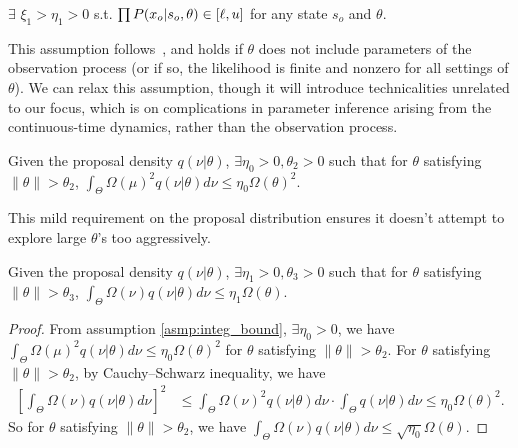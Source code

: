 \begin{assumption}
$\exists$ $ \xi_1 > \eta_1 > 0$ s.t.
$\prod P(x_o | s_o, \theta) \in [\ell, u]$ for any state $s_o$ and $\theta$.%
  \label{asmp:obs_bnd}
\end{assumption}
\noindent This assumption follows~\cite{miasojedow2017}, and holds if
$\theta$ does not include parameters of the observation process (or if so,
the likelihood is finite and nonzero for all settings of $\theta$). We can relax this assumption,
though it will introduce technicalities unrelated to our focus, which 
is on complications in parameter inference arising from the continuous-time
dynamics, rather than the observation process. 

\begin{assumption}
Given the proposal density $q(\nu | \theta)$, $\exists \eta_0 > 0, \theta_2 > 0$ 
such that for $\theta$ satisfying $\| \theta \|  > \theta_2$, 
$ \int_\Theta \Omega(\mu)^2 q(\nu | \theta)d\nu \leq \eta_0 \Omega(\theta)^2.$
\label{asmp:integ_bound}
\end{assumption}
\noindent This mild requirement on the proposal distribution ensures it 
doesn't attempt
to explore large $\theta$'s too aggressively.
\begin{corollary}
Given the proposal density $q(\nu | \theta)$, $\exists \eta_1 > 0, \theta_3 > 0$ such that for $\theta$ 
satisfying $\| \theta \|  > \theta_3$, 
$ \int_\Theta \Omega(\nu) q(\nu | \theta)d\nu \leq \eta_1 \Omega(\theta).$
\label{corol:integ_bound}
\end{corollary}
\begin{proof}
From assumption \ref{asmp:integ_bound},  $\exists \eta_0 > 0$, we have $ \int_\Theta \Omega(\mu)^2 q(\nu | \theta)d\nu \leq \eta_0 \Omega(\theta)^2$ for $\theta$ satisfying $\| \theta \|  > \theta_2$.
For $\theta$ satisfying $\| \theta \|  > \theta_2$, by Cauchy–Schwarz inequality, we have
\begin{align*}
\left[ \int_\Theta \Omega(\nu) q(\nu | \theta) d\nu \right]^2 &\le \int_\Theta \Omega(\nu)^2 q(\nu | \theta) d\nu \cdot \int_\Theta q(\nu | \theta) d\nu \le \eta_0 \Omega(\theta)^2.
\end{align*}
So for $\theta$ satisfying $\| \theta \|  > \theta_2$, we have $\int_\Theta \Omega(\nu) q(\nu | \theta) d\nu \le \sqrt{\eta_0} \Omega(\theta).$
\end{proof}

